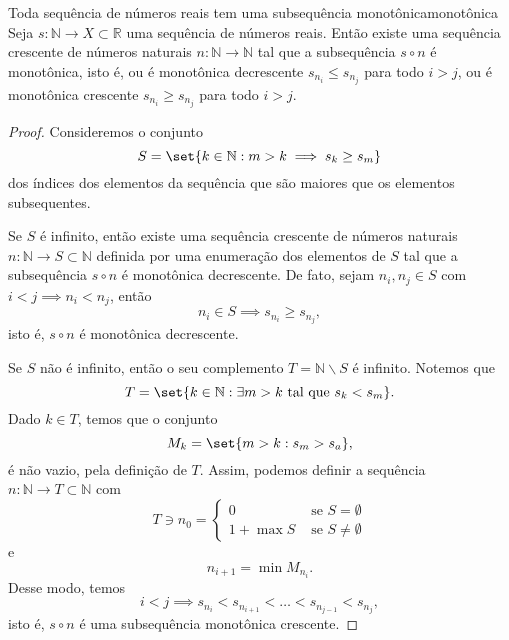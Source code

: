 \begin{lemma}{Toda sequência de números reais tem uma subsequência monotônica}{monotônica}
    Seja \(s: \mathbb{N} \to X \subset \mathbb{R}\) uma sequência de números reais. Então existe uma sequência crescente de números naturais \(n : \mathbb{N} \to \mathbb{N}\) tal que a subsequência \(s\circ n\) é monotônica, isto é, ou é monotônica decrescente \(s_{n_{i}} \leq s_{n_{j}}\) para todo \(i > j\), ou é monotônica crescente \(s_{n_{i}} \geq s_{n_{j}}\) para todo \(i > j\).
\end{lemma}
\begin{proof}
    Consideremos o conjunto
    \begin{equation*}
        S = \set{k \in \mathbb{N} : m > k \implies s_k \geq s_m}
    \end{equation*}
    dos índices dos elementos da sequência que são maiores que os elementos subsequentes.

    Se \(S\) é infinito, então existe uma sequência crescente de números naturais \(n : \mathbb{N} \to S \subset \mathbb{N}\) definida por uma enumeração dos elementos de \(S\) tal que a subsequência \(s \circ n\) é monotônica decrescente. De fato, sejam \(n_i, n_j \in S\) com \(i < j \implies n_i < n_j\), então
    \begin{equation*}
        n_i \in S \implies s_{n_i} \geq s_{n_j},
    \end{equation*}
    isto é, \(s\circ n\) é monotônica decrescente.

    Se \(S\) não é infinito, então o seu complemento \(T = \mathbb{N} \smallsetminus S\) é infinito. Notemos que
    \begin{equation*}
        T = \set{k \in \mathbb{N} : \exists m > k\text{ tal que }s_k < s_m}.
    \end{equation*}
    Dado \(k \in T\), temos que o conjunto
    \begin{equation*}
        M_k = \set{m > k : s_m > s_a},
    \end{equation*}
    é não vazio, pela definição de \(T\). Assim, podemos definir a sequência \(n : \mathbb{N} \to T \subset \mathbb{N}\) com
    \begin{equation*}
        T \ni n_0 = \begin{cases}
            0 &\text{ se }S=\emptyset\\
            1 + \max{S}&\text{ se }S \neq \emptyset
        \end{cases}
    \end{equation*}
    e
    \begin{equation*}
        n_{i+1} = \min{M_{n_i}}.
    \end{equation*}
    Desse modo, temos
    \begin{equation*}
        i < j \implies s_{n_{i}} < s_{n_{i+1}} < \dots < s_{n_{j-1}} < s_{n_j},
    \end{equation*}
    isto é, \(s\circ n\) é uma subsequência monotônica crescente.
\end{proof}

